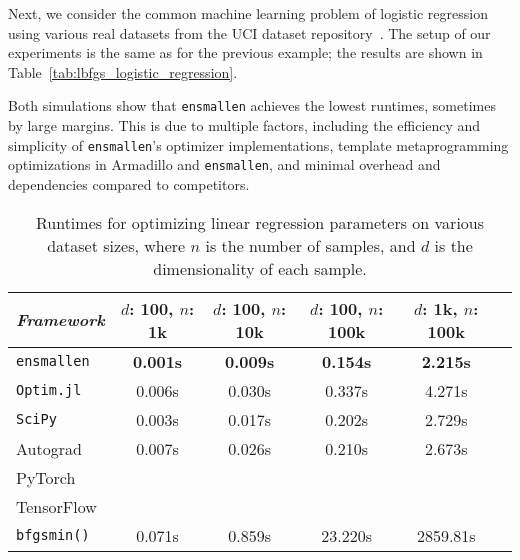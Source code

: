 \documentclass[twoside,11pt]{article}
\begin{document}
Next, we consider the common machine learning problem of logistic regression
using various real datasets from the UCI dataset
repository~\citep{ucimlrepository}.  The setup of our experiments is the same as for
the previous example; the results are shown in
Table~\ref{tab:lbfgs_logistic_regression}.

Both simulations show that {\tt ensmallen} achieves the lowest runtimes,
sometimes by large margins.  This is due to multiple factors, including the
efficiency and simplicity of {\tt ensmallen}'s optimizer implementations,
template metaprogramming optimizations in Armadillo and {\tt ensmallen}, and
minimal overhead and dependencies compared to competitors.

\begin{table}[b!]
{\small
\centering
\begin{tabular}{lccccc}
\toprule
{\em Framework} & $d$: 100, $n$: 1k & $d$: 100, $n$: 10k & $d$: 100, $n$:
100k & $d$: 1k, $n$: 100k \\
\midrule
\texttt{ensmallen} & {\bf 0.001s} & {\bf 0.009s} & {\bf 0.154s} & {\bf 2.215s} \\
\texttt{Optim.jl}  & 0.006s & 0.030s & 0.337s & 4.271s \\
\texttt{SciPy} & 0.003s & 0.017s & 0.202s & 2.729s \\
Autograd & 0.007s & 0.026s & 0.210s & 2.673s \\
PyTorch & \\
TensorFlow & \\
\texttt{bfgsmin()} & 0.071s & 0.859s & 23.220s & 2859.81s\\
\bottomrule
\end{tabular}
\vspace*{-0.7em}
\caption{
Runtimes for optimizing linear regression parameters on various dataset sizes,
where $n$ is the number of samples,
and $d$ is the dimensionality of each sample.
}
\label{tab:lbfgs}
}
\vspace*{-1.2em}
\end{table}
\end{document}
